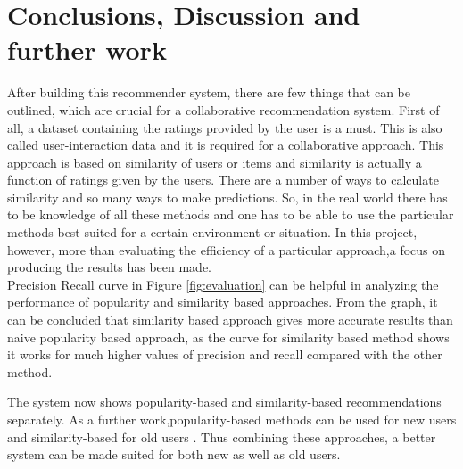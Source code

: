 \documentclass{jot}
\begin{document}
\section{Conclusions, Discussion and further work}

After building this recommender system, there are few things that can be outlined, which are crucial for a collaborative recommendation system. First of all, a dataset containing the ratings provided by the user is a must. This is also called user-interaction data and it is required  for a collaborative approach. This approach is based on similarity of users or items and similarity is actually a function of ratings given by the users. There are a number of ways to calculate similarity and so many ways to make predictions. So, in the real world there has to be knowledge of all these methods and one has to be able to use the particular methods best suited for a certain environment or situation. In this project, however, more than evaluating the efficiency of a particular approach,a focus on producing the results has been made.\\

Precision Recall curve in Figure \ref{fig:evaluation} can be helpful in analyzing the performance of popularity and similarity based approaches. From the graph, it can be concluded that similarity based approach gives more accurate results than naive popularity based approach, as the curve for similarity based method shows it works for much higher values of precision and recall compared with the other method.

The system now shows popularity-based and similarity-based recommendations separately. As a further work,popularity-based methods can be used for new users and similarity-based for old users . Thus combining these approaches, a better system can be made suited for both new as well as old users.

\backmatter

\nocite{*}



\abouttheauthors
\end{document}
